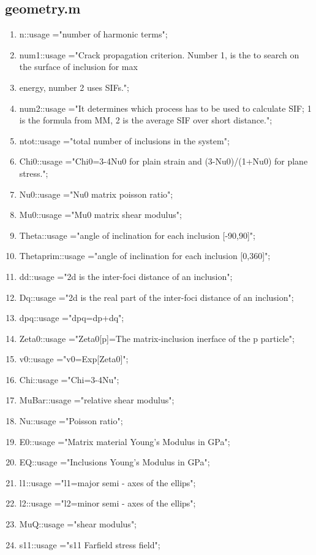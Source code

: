 \documentclass[12pt]{article}
\numberwithin{equation}{subsection}
\begin{document}
\subsection*{geometry.m}
\begin{enumerate}
\item n::usage ="number of harmonic terms";
\item  num1::usage ="Crack propagation criterion. Number 1, is the to search on the surface of inclusion for max \item  energy, number 2 uses SIFs.";
\item  num2::usage ="It determines which process has to be used to calculate SIF; 1 is the formula from MM, 2 is the average SIF over short distance.";
\item ntot::usage ="total number of inclusions in the system";
\item Chi0::usage ="Chi0=3-4Nu0 for plain strain and (3-Nu0)/(1+Nu0) for plane stress.";
\item Nu0::usage ="Nu0 matrix poisson ratio";
\item Mu0::usage ="Mu0 matrix shear modulus";
\item Theta::usage ="angle of inclination for each inclusion [-90,90]";
\item Thetaprim::usage ="angle of inclination for each inclusion [0,360]";
\item dd::usage ="2d is the inter-foci distance of an inclusion";
\item Dq::usage ="2d is the real part of the inter-foci distance of an inclusion";
\item dpq::usage ="dpq=dp+dq";
\item Zeta0::usage ="Zeta0[p]=The matrix-inclusion inerface of the p particle";
\item v0::usage ="v0=Exp[Zeta0]";
\item Chi::usage ="Chi=3-4Nu";
\item MuBar::usage ="relative shear modulus";
\item Nu::usage ="Poisson ratio";
\item E0::usage ="Matrix material Young's Modulus in GPa";
\item EQ::usage ="Inclusions Young's Modulus in GPa";
\item l1::usage ="l1=major semi - axes of the ellips";
\item l2::usage ="l2=minor semi - axes of the ellips";
\item MuQ::usage ="shear modulus";
\item s11::usage ="s11 Farfield stress field";

\end{enumerate}
\end{document}
